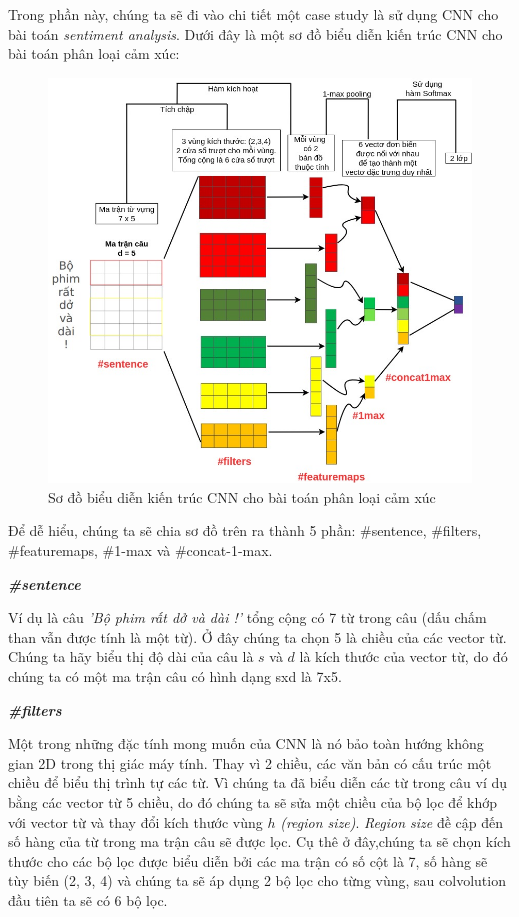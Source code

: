 Trong phần này, chúng ta sẽ đi vào chi tiết một case study là
sử dụng CNN cho bài toán \textit{sentiment analysis}. Dưới đây là một sơ đồ biểu diễn kiến trúc CNN cho bài toán phân loại cảm xúc:

\begin{figure}[!h]
	\centering
		\includegraphics[width=1\columnwidth]{books/artificial-neural-network/chapter05/figure/convolution-example-10.jpg}
        \caption{Sơ đồ biểu diễn kiến trúc CNN cho bài toán phân loại cảm xúc}
        \label{fig:convolutionexample10}
\end{figure}

Để dễ hiểu, chúng ta sẽ chia sơ đồ trên ra thành 5 phần: \#sentence, \#filters, \#featuremaps, \#1-max và \#concat-1-max.

\textbf{\textit{\#sentence}}

Ví dụ là câu \textit{'Bộ phim rất dở và dài !'} tổng cộng có 7 từ trong câu (dấu chấm than vẫn được tính là một từ). Ở đây chúng ta chọn 5 là chiều của các vector từ. Chúng ta hãy biểu thị độ dài của câu là $s$ và $d$ là kích thước của vector từ, do đó chúng ta có một ma trận câu có hình dạng sxd là 7x5.

\textbf{\textit{\#filters}}

Một trong những đặc tính mong muốn của CNN là nó bảo toàn hướng không gian 2D trong thị giác máy tính. Thay vì 2 chiều, các văn bản có cấu trúc một chiều để biểu thị trình tự các từ. Vì chúng ta đã biểu diễn các từ trong câu ví dụ bằng các vector từ 5 chiều, do đó chúng ta sẽ sửa một chiều của bộ lọc để khớp với vector từ và thay đổi kích thước vùng $h$ \textit{(region size)}. \textit{Region size} đề cập đến số hàng của từ trong ma trận câu sẽ được lọc. Cụ thê ở đây,chúng ta sẽ chọn kích thước cho các bộ lọc được biểu diễn bởi các ma trận có số cột là 7, số hàng sẽ tùy biến (2, 3, 4) và chúng ta sẽ áp dụng 2 bộ lọc cho từng vùng, sau colvolution đầu tiên ta sẽ có 6 bộ lọc.

